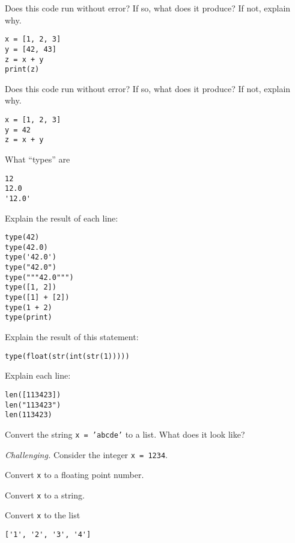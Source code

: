\documentclass[11pt]{exam}
\begin{document}
\begin{questions}
\item Does this code run without error?  If so, what does it produce?  If not, explain why.
\begin{verbatim}
x = [1, 2, 3]
y = [42, 43]
z = x + y
print(z) 
\end{verbatim}

\item Does this code run without error?  If so, what does it produce?  If not, explain why.
\begin{verbatim}
x = [1, 2, 3]
y = 42 
z = x + y
\end{verbatim}

\item What ``types'' are 
\begin{verbatim}
12
12.0 
'12.0'
\end{verbatim} 

\item Explain the result of each line:  
\begin{verbatim}
type(42)
type(42.0)
type('42.0')
type("42.0")
type("""42.0""")
type([1, 2])
type([1] + [2])
type(1 + 2)
type(print)
\end{verbatim}

\item Explain the result of this statement:    
\begin{verbatim}
type(float(str(int(str(1)))))
\end{verbatim}

\item Explain each line:  
\begin{verbatim}
len([113423])
len("113423")
len(113423)    
\end{verbatim}


\item Convert the string \texttt{x = 'abcde'} to a list.  What does it look like?  

\item {\it Challenging.\/}
Consider the integer \texttt{x = 1234}. 
\begin{parts}
\item Convert \texttt{x} to a floating point number.
\item Convert \texttt{x} to a string.
\item Convert \texttt{x} to the list 
\begin{verbatim}
['1', '2', '3', '4'] 
\end{verbatim} 

\end{parts} 


\end{questions}
\end{document}
